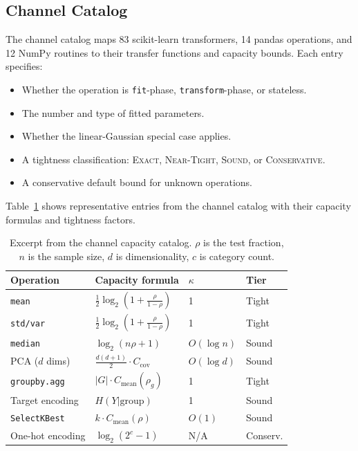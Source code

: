 \documentclass[11pt]{article}
\begin{document}
\subsection{Channel Catalog}

The channel catalog maps 83 scikit-learn transformers, 14 pandas
operations, and 12 NumPy routines to their transfer functions and
capacity bounds.  Each entry specifies:
\begin{itemize}
  \item Whether the operation is \texttt{fit}-phase,
    \texttt{transform}-phase, or stateless.
  \item The number and type of fitted parameters.
  \item Whether the linear-Gaussian special case applies.
  \item A tightness classification: \textsc{Exact}, \textsc{Near-Tight},
    \textsc{Sound}, or \textsc{Conservative}.
  \item A conservative default bound for unknown operations.
\end{itemize}

Table~\ref{tab:catalog_excerpt} shows representative entries from the
channel catalog with their capacity formulas and tightness factors.

\begin{table}[t]
\centering
\caption{Excerpt from the channel capacity catalog.  $\rho$ is the
  test fraction, $n$ is the sample size, $d$ is dimensionality,
  $c$ is category count.}
\label{tab:catalog_excerpt}
\begin{tabular}{@{}llll@{}}
\toprule
\textbf{Operation} & \textbf{Capacity formula} & \textbf{$\kappa$} & \textbf{Tier} \\
\midrule
\texttt{mean} & $\tfrac{1}{2}\log_2(1+\frac{\rho}{1-\rho})$ & 1 & Tight \\
\texttt{std/var} & $\tfrac{1}{2}\log_2(1+\frac{\rho}{1-\rho})$ & 1 & Tight \\
\texttt{median} & $\log_2(n\rho+1)$ & $O(\log n)$ & Sound \\
PCA ($d$ dims) & $\tfrac{d(d+1)}{2}\cdot C_{\text{cov}}$ & $O(\log d)$ & Sound \\
\texttt{groupby.agg} & $|G|\cdot C_{\text{mean}}(\rho_g)$ & 1 & Tight \\
Target encoding & $H(Y|\text{group})$ & 1 & Sound \\
\texttt{SelectKBest} & $k\cdot C_{\text{mean}}(\rho)$ & $O(1)$ & Sound \\
One-hot encoding & $\log_2(2^c-1)$ & N/A & Conserv. \\
\bottomrule
\end{tabular}
\end{table}
\end{document}
